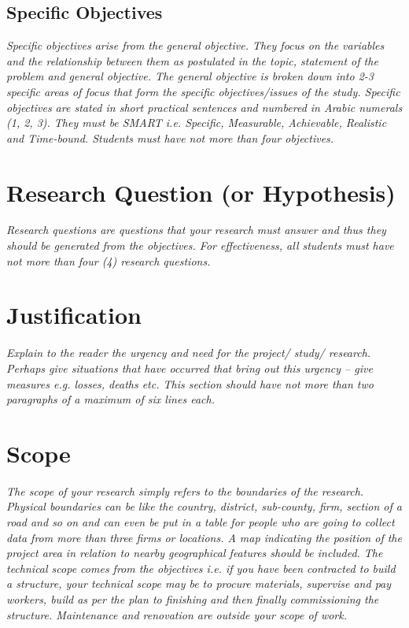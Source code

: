 \subsection{Specific Objectives}
\emph{Specific objectives arise from the general objective.
	They focus on the variables and the relationship between them as postulated in the topic, statement of the problem and general objective.
	The general objective is broken down into 2-3 specific areas of focus that form the specific objectives/issues of the study.
	Specific objectives are stated in short practical sentences and numbered in Arabic numerals (1, 2, 3).
	They must be SMART i.e. Specific, Measurable, Achievable, Realistic and Time-bound.
	Students must have not more than four objectives.}

\section{Research Question (or Hypothesis)}
\emph{Research questions are questions that your research must answer and thus they should be generated from the objectives. For effectiveness, all students must have not more than four (4) research questions.}

\section{Justification}
\emph{Explain to the reader the urgency and need for the project/ study/ research.
	Perhaps give situations that have occurred that bring out this urgency – give measures e.g. losses, deaths etc.
	This section should have not more than two paragraphs of a maximum of six lines each.}

\section{Scope}
\emph{The scope of your research simply refers to the boundaries of the research.
	Physical boundaries can be like the country, district, sub-county, firm, section of a road and so on and can even be put in a table for people who are going to collect data from more than three firms or locations.
	A map indicating the position of the project area in relation to nearby geographical features should be included.
	The technical scope comes from the objectives i.e. if you have been contracted to build a structure, your technical scope may be to procure materials, supervise and pay workers, build as per the plan to finishing and then finally commissioning the structure.
	Maintenance and renovation are outside your scope of work.}